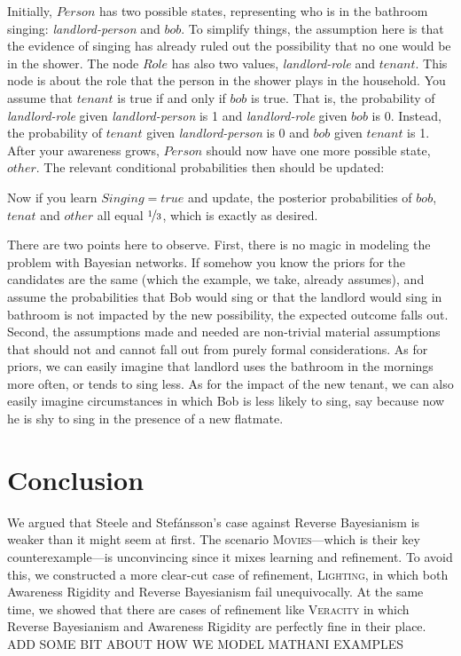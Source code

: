 \documentclass[
  11pt,
  dvipsnames,enabledeprecatedfontcommands]{scrartcl}
\begin{document}
Initially, \(Person\) has two possible states, representing who is in
the bathroom singing: \textit{landlord-person} and \(bob\). To simplify
things, the assumption here is that the evidence of singing has already
ruled out the possibility that no one would be in the shower. The node
\(Role\) has also two values, \textit{landlord-role} and \(tenant\).
This node is about the role that the person in the shower plays in the
household. You assume that \(tenant\) is true if and only if \(bob\) is
true. That is, the probability of \textit{landlord-role} given
\textit{landlord-person} is 1 and \textit{landlord-role} given \(bob\)
is 0. Instead, the probability of \(tenant\) given
\textit{landlord-person} is 0 and \(bob\) given \(tenant\) is 1. After
your awareness grows, \(Person\) should now have one more possible
state, \(other\). The relevant conditional probabilities then should be
updated:

Now if you learn \(Singing = true\) and update, the posterior
probabilities of \(bob\), \(tenat\) and \(other\) all equal
\(\nicefrac{1}{3}\), which is exactly as desired.

There are two points here to observe. First, there is no magic in
modeling the problem with Bayesian networks. If somehow you know the
priors for the candidates are the same (which the example, we take,
already assumes), and assume the probabilities that Bob would sing or
that the landlord would sing in bathroom is not impacted by the new
possibility, the expected outcome falls out. Second, the assumptions
made and needed are non-trivial material assumptions that should not and
cannot fall out from purely formal considerations. As for priors, we can
easily imagine that landlord uses the bathroom in the mornings more
often, or tends to sing less. As for the impact of the new tenant, we
can also easily imagine circumstances in which Bob is less likely to
sing, say because now he is shy to sing in the presence of a new
flatmate.

\hypertarget{conclusion}{%
\section{Conclusion}\label{conclusion}}

We argued that Steele and Stefánsson's case against Reverse Bayesianism
is weaker than it might seem at first. The scenario
\textsc{Movies}---which is their key counterexample---is unconvincing
since it mixes learning and refinement. To avoid this, we constructed a
more clear-cut case of refinement, \textsc{Lighting}, in which both
Awareness Rigidity and Reverse Bayesianism fail unequivocally. At the
same time, we showed that there are cases of refinement like
\textsc{Veracity} in which Reverse Bayesianism and Awareness Rigidity
are perfectly fine in their place. ADD SOME BIT ABOUT HOW WE MODEL
MATHANI EXAMPLES
\end{document}
